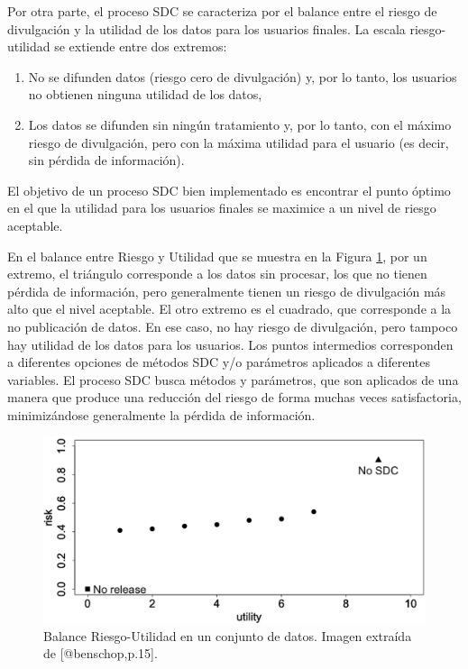 \documentclass[]{book}
\providecommand{\tightlist}{%
  \setlength{\itemsep}{0pt}\setlength{\parskip}{0pt}}
\theoremstyle{definition}
\theoremstyle{definition}
\theoremstyle{definition}
\theoremstyle{definition}
\theoremstyle{remark}
\begin{document}
Por otra parte, el proceso SDC se caracteriza por el balance entre el riesgo de divulgación y la utilidad de los datos para los usuarios finales. La escala riesgo-utilidad se extiende entre dos extremos:

\begin{enumerate}
\def\labelenumi{\roman{enumi}.}
\tightlist
\item
  No se difunden datos (riesgo cero de divulgación) y, por lo tanto, los usuarios no obtienen ninguna utilidad de los datos,
\item
  Los datos se difunden sin ningún tratamiento y, por lo tanto, con el máximo riesgo de divulgación, pero con la máxima utilidad para el usuario (es decir, sin pérdida de información).
\end{enumerate}

El objetivo de un proceso SDC bien implementado es encontrar el punto óptimo en el que la utilidad para los usuarios finales se maximice a un nivel de riesgo aceptable.

En el balance entre Riesgo y Utilidad que se muestra en la Figura \ref{fig:balance}, por un extremo, el triángulo corresponde a los datos sin procesar, los que no tienen pérdida de información, pero generalmente tienen un riesgo de divulgación más alto que el nivel aceptable. El otro extremo es el cuadrado, que corresponde a la no publicación de datos. En ese caso, no hay riesgo de divulgación, pero tampoco hay utilidad de los datos para los usuarios. Los puntos intermedios corresponden a diferentes opciones de métodos SDC y/o parámetros aplicados a diferentes variables. El proceso SDC busca métodos y parámetros, que son aplicados de una manera que produce una reducción del riesgo de forma muchas veces satisfactoria, minimizándose generalmente la pérdida de información.

\begin{figure}

{\centering \includegraphics[width=16.92in]{fig1} 

}

\caption{Balance Riesgo-Utilidad en un conjunto de datos. Imagen extraída de [@benschop,p.15].}\label{fig:balance}
\end{figure}
\end{document}

